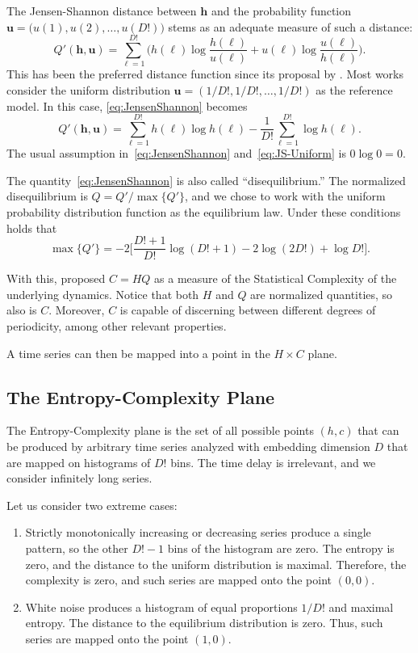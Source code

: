 \documentclass[alpha-refs]{wiley-article}
\begin{document}
The Jensen-Shannon distance between $\bm h$ and the probability function $\bm u=\big(u(1), u(2), \dots, u(D!)\big)$ stems as an adequate measure of such a distance:
\begin{equation}
Q'(\bm{h}, \bm{u}) = \sum_{\ell=1}^{D!} \Big(h(\ell) \log\frac{h(\ell)}{u(\ell)} +
u(\ell) \log\frac{u(\ell)}{h(\ell)}
\Big).
\label{eq:JensenShannon}
\end{equation}
This has been the preferred distance function since its proposal by \citet{Lamberti2004}.
Most works consider the uniform distribution $\bm u = (1/D!, 1/D!, \dots, 1/D!)$ as the reference model.
In this case, \eqref{eq:JensenShannon} becomes
\begin{equation}
Q'(\bm{h}, \bm{u}) = \sum_{\ell=1}^{D!} h(\ell) \log h(\ell) - \frac{1}{D!} \sum_{\ell=1}^{D!} \log h(\ell).
\label{eq:JS-Uniform}
\end{equation}
The usual assumption in~\eqref{eq:JensenShannon} and~\eqref{eq:JS-Uniform} is $0\log 0=0$.

The quantity~\eqref{eq:JensenShannon} is also called ``disequilibrium.''
The normalized disequilibrium is $ Q=Q'/\max\{Q'\}$, and we chose to work with the uniform probability distribution function as the equilibrium law.
Under these conditions holds that
$$
\max\{Q'\} = -2\Big[
\frac{D!+1}{D!} \log(D!+1) - 2 \log(2D!) + \log D!
\Big].
$$

With this, \citet{Lamberti2004} proposed $C=HQ$ as a measure of the Statistical Complexity of the underlying dynamics.
Notice that both $H$ and $Q$ are normalized quantities, so also is $C$. 
Moreover, $C$ is capable of discerning between different degrees of periodicity, among other relevant properties.

A time series can then be mapped into a point in the $H\times C$ plane.

\subsection{The Entropy-Complexity Plane}\label{Sec:HCPlane}

The Entropy-Complexity plane is the set of all possible points $(h,c)$ that can be produced by arbitrary time series analyzed with embedding dimension $D$ that are mapped on histograms of $D!$ bins.
The time delay is irrelevant, and we consider infinitely long series.

Let us consider two extreme cases:
\begin{enumerate}[label=Case~\Roman*., align=left, leftmargin=*]
\item 	Strictly monotonically increasing or decreasing series produce a single pattern, so the other $D!-1$ bins of the histogram are zero. 
The entropy is zero, and the distance to the uniform distribution is maximal. 
Therefore, the complexity is zero, and such series are mapped onto the point $(0,0)$.
\item 	White noise produces a histogram of equal proportions $1/D!$ and maximal entropy. 
The distance to the equilibrium distribution is zero. 
Thus, such series are mapped onto the point $(1,0)$.
\end{enumerate}
\end{document}
